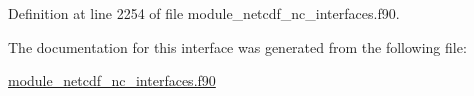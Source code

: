 Definition at line 2254 of file module\+\_\+netcdf\+\_\+nc\+\_\+interfaces.\+f90.



The documentation for this interface was generated from the following file\+:\begin{DoxyCompactItemize}
\item 
\hyperlink{module__netcdf__nc__interfaces_8f90}{module\+\_\+netcdf\+\_\+nc\+\_\+interfaces.\+f90}\end{DoxyCompactItemize}
